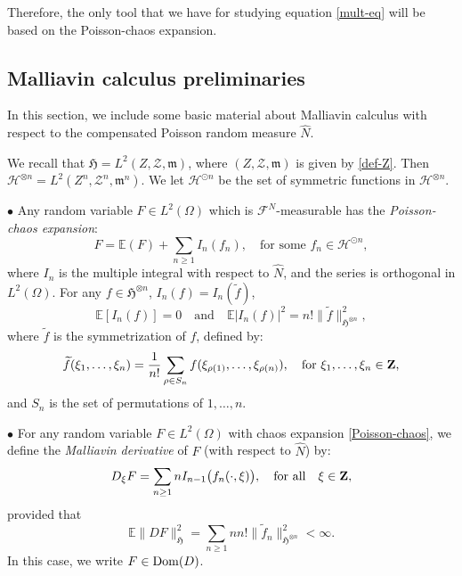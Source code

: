 \documentclass[12pt]{article}
\def\cB{\mathcal{B}}
\def\cF{\mathcal{F}}
\def\cH{\mathcal{H}}
\def\cZ{\mathcal{Z}}
\def\bE{\mathbb{E}}
\def\bR{\mathbb{R}}
\newcommand{\fH}{\mathfrak{H}}
\newcommand{\fm}{\mathfrak{m}}
\begin{document}
Therefore, the only tool that we have for studying equation \eqref{mult-eq} will be based on the Poisson-chaos expansion.


\subsection{Malliavin calculus preliminaries}


In this section, we include some basic material about Malliavin calculus with respect to the compensated Poisson random measure $\widehat{N}$.



We recall that $\fH=L^2(Z,\cZ,\fm)$, where $(Z,\cZ,\fm)$ is given by \eqref{def-Z}.
Then $\cH^{\otimes n}=L^2(Z^n,\cZ^{n},\fm^n)$. We let $\cH^{\odot n}$ be the set of symmetric functions in $\cH^{\otimes n}$.

\medskip

$\bullet$
Any random variable $F \in L^2(\Omega)$ which is $\cF^N$-measurable has the {\em Poisson-chaos expansion}:
\begin{equation}
\label{Poisson-chaos}
F=\bE(F)+\sum_{n\geq 1}I_n(f_n), \quad \mbox{for some $f_n \in \cH^{\odot n}$},
\end{equation}
where $I_n$ is the multiple integral with respect to $\widehat{N}$, and the series is orthogonal in $L^2(\Omega)$. 
For any $f \in \fH^{\otimes n}$, $I_n(f)=I_n(\widetilde{f})$,
\[
\bE[I_n(f)]=0 \quad \mbox{and} \quad \bE|I_n(f)|^2=n! \|\widetilde{f}\|_{\fH^{\otimes n}}^2,
\]
where $\widetilde{f}$ is the symmetrization of $f$, defined by:
\[
\widetilde{f}(\xi_1,\ldots,\xi_n)=\frac{1}{n!}\sum_{\rho \in S_n} f(\xi_{\rho(1)},\ldots,\xi_{\rho(n)}), \quad \mbox{for $\xi_1,\ldots,\xi_n \in {\bf Z}$},
\]
and $S_n$ is the set of permutations of $1,\ldots,n$. 

\medskip
$\bullet$
For any random variable $F \in L^2(\Omega)$ with chaos expansion \eqref{Poisson-chaos}, we define the {\em Malliavin derivative} of $F$ (with respect to $\widehat{N}$) by:
\[
D_{\xi}F=\sum_{n\geq 1}nI_{n-1}\big(f_n(\cdot,\xi)\big), \quad \mbox{for all} \quad \xi \in {\bf Z},
\]
provided that 
\[
\bE\|DF\|_{\fH}^2=\sum_{n\geq 1}nn! \|\widetilde{f}_n\|_{\fH^{\otimes n}}^2<\infty.
\] In this case, we write $F \in {\rm Dom}(D)$.

\medskip
\end{document}

